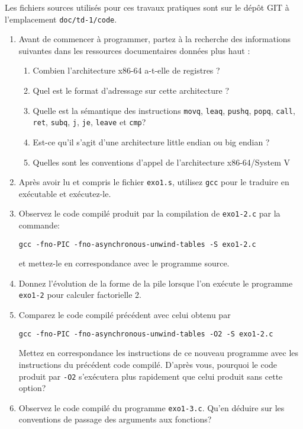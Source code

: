 \documentclass{article}
\begin{document}
\medskip

Les fichiers sources utilisés pour ces travaux pratiques sont sur le dépôt GIT à
l'emplacement \verb!doc/td-1/code!.

\begin{exercise}
  \-
  \begin{enumerate}
  \item Avant de commencer à programmer, partez à la recherche des informations suivantes dans les
    ressources documentaires données plus haut :
    \begin{enumerate}
    \item Combien l’architecture x86-64 a-t-elle de registres ?
    \item Quel est le format d’adressage sur cette architecture ?
    \item Quelle est la sémantique des instructions \verb!movq!, \verb!leaq!, \verb!pushq!, \verb!popq!,
      \verb!call!, \verb!ret!, \verb!subq!, \verb!j!, \verb!je!, \verb!leave! et \verb!cmp!?
    \item Est-ce qu’il s’agit d’une architecture little endian ou big endian ?
    \item Quelles sont les conventions d'appel de l'architecture x86-64/System V
    \end{enumerate}
  \item
    Après avoir lu et compris le fichier \verb!exo1.s!, utilisez
    \verb!gcc! pour le traduire en exécutable et
    exécutez-le.

\item Observez le code compilé produit par la compilation de \verb!exo1-2.c! par la commande:
\begin{verbatim}
gcc -fno-PIC -fno-asynchronous-unwind-tables -S exo1-2.c
\end{verbatim}
et mettez-le en correspondance avec le programme source.

\item
  Donnez l'évolution de la forme de la pile lorsque l'on exécute le programme \verb!exo1-2!
  pour calculer factorielle 2.

\item
Comparez le code compilé précédent avec celui obtenu par
\begin{verbatim}
gcc -fno-PIC -fno-asynchronous-unwind-tables -O2 -S exo1-2.c
\end{verbatim}
Mettez en correspondance les instructions de ce nouveau programme avec
les instructions du précédent code compilé. D'après vous, pourquoi le
code produit par \verb!-O2! s'exécutera plus rapidement que celui
produit sans cette option?

\item
  Observez le code compilé du programme \verb!exo1-3.c!. Qu'en déduire
  sur les conventions de passage des arguments aux fonctions?

\end{enumerate}
\end{exercise}
\end{document}
